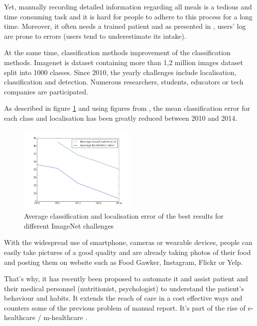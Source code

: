 Yet, manually recording detailed information regarding all meals is a tedious and time consuming task and it is hard for people to adhere to this process for a long time. Moreover, it often needs a trained patient and as presented in \cite{Lichtman1992}, users' log are prone to errors (users tend to underestimate its intake).

At the same time, classification methods improvement of the classification methods. Imagenet is dataset containing more than 1,2 million images dataset split into 1000 classes. Since 2010, the yearly challenges include localisation, classification and detection. Numerous researchers, students, educators or tech companies are participated.

As described in figure \ref{fig:imagenet_results} and using figures from \cite{Russakovsky2015}, the 
mean classification error for each class and localisation has been greatly reduced between 2010 and 2014.

\begin{figure}[h]
    \centering
    \includegraphics[width=0.5\textwidth,  height=0.455\textwidth ]{img/imagenet}
    \caption{Average classification and localisation error of the best results for different ImageNet challenges}
    \label{fig:imagenet_results}
\end{figure}

With the widespread use of smartphone, cameras or wearable devices, people can easily take pictures of a good quality and are already taking photos of their food and posting them on website such as Food Gawker, Instagram, Flickr or Yelp.

That's why, it has recently been proposed to automate it and assist patient and their medical personnel (nutritionist, psychologist) to understand the patient's behaviour and habits. It extends the reach of care in a cost effective ways and counters some of the previous problem of manual report. It's part of the rise of e-healthcare / m-healthcare \cite{Hillestad2005, Menachemi2011}.

